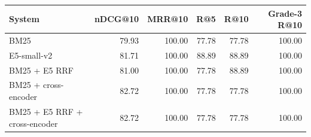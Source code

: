 \begin{tabular}{lrrrrr}
\toprule
System & nDCG@10 & MRR@10 & R@5 & R@10 & Grade-3 R@10 \\
\midrule
BM25 & 79.93 & 100.00 & 77.78 & 77.78 & 100.00 \\
E5-small-v2 & 81.71 & 100.00 & 88.89 & 88.89 & 100.00 \\
BM25 + E5 RRF & 81.00 & 100.00 & 77.78 & 88.89 & 100.00 \\
BM25 + cross-encoder & 82.72 & 100.00 & 77.78 & 77.78 & 100.00 \\
BM25 + E5 RRF + cross-encoder & 82.72 & 100.00 & 77.78 & 77.78 & 100.00 \\
\bottomrule
\end{tabular}

